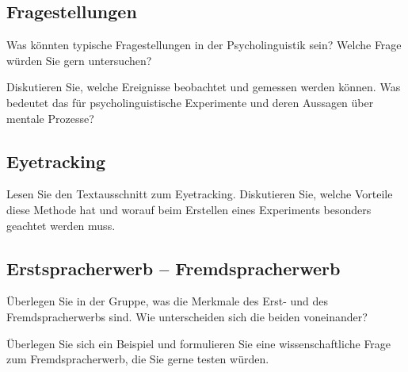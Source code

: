 \documentclass[11pt]{book}
\begin{document}
\subsection*{Fragestellungen}

Was könnten typische Fragestellungen in der Psycholinguistik sein? Welche Frage würden Sie gern untersuchen?

Diskutieren Sie, welche Ereignisse beobachtet und gemessen werden können. Was bedeutet das für psycholinguistische Experimente und deren Aussagen über mentale Prozesse?

\vspace{1cm}

\subsection*{Eyetracking}

Lesen Sie den Textausschnitt zum Eyetracking. Diskutieren Sie, welche Vorteile diese Methode hat und worauf beim Erstellen eines Experiments besonders geachtet werden muss.


\vspace{1cm}

\subsection*{Erstspracherwerb – Fremdspracherwerb}

Überlegen Sie in der Gruppe, was die Merkmale des Erst- und des Fremdspracherwerbs sind. Wie unterscheiden sich die beiden voneinander?

Überlegen Sie sich ein Beispiel und formulieren Sie eine wissenschaftliche Frage zum Fremdspracherwerb, die Sie gerne testen würden.
\end{document}
